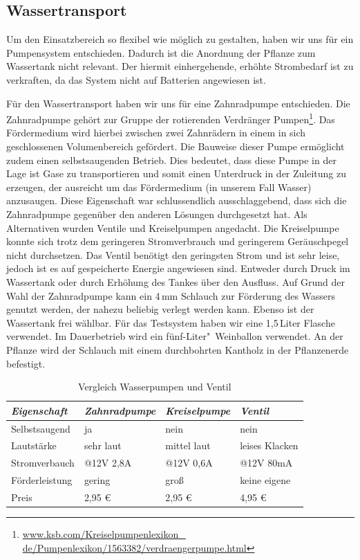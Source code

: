 \subsection{Wassertransport}
Um den Einsatzbereich so flexibel wie möglich zu gestalten, haben wir uns für ein Pumpensystem entschieden. 
Dadurch ist die Anordnung der Pflanze zum Wassertank nicht relevant. 
Der hiermit einhergehende, erhöhte Strombedarf ist zu verkraften, da das System nicht auf Batterien angewiesen ist.

Für den Wassertransport haben wir uns für eine Zahnradpumpe entschieden.
Die Zahnradpumpe gehört zur Gruppe der rotierenden Verdränger Pumpen\footnote{\href{http://www.ksb.com/Kreiselpumpenlexikon\_de/Pumpenlexikon/1563382/verdraengerpumpe.html}{www.ksb.com/Kreiselpumpenlexikon\_ \\ de/Pumpenlexikon/1563382/verdraengerpumpe.html}}.
Das Fördermedium wird hierbei zwischen zwei Zahnrädern in einem in sich geschlossenen Volumenbereich gefördert.
Die Bauweise dieser Pumpe ermöglicht zudem einen selbstsaugenden Betrieb. 
Dies bedeutet, dass diese Pumpe in der Lage ist Gase zu transportieren und somit einen Unterdruck in der Zuleitung zu erzeugen, der ausreicht um das Fördermedium (in unserem Fall Wasser) anzusaugen. 
Diese Eigenschaft war schlussendlich ausschlaggebend, dass sich die Zahnradpumpe gegenüber den anderen Lösungen durchgesetzt hat.
Als Alternativen wurden Ventile und Kreiselpumpen angedacht.
Die Kreiselpumpe konnte sich trotz dem geringeren Stromverbrauch und geringerem Geräuschpegel nicht durchsetzen. 
Das Ventil benötigt den geringsten Strom und ist sehr leise, jedoch ist es auf gespeicherte Energie angewiesen sind.  
Entweder durch Druck im Wassertank oder durch Erhöhung des Tankes über den Ausfluss. 
Auf Grund der Wahl der Zahnradpumpe kann ein 4\,mm Schlauch zur Förderung des Wassers genutzt werden, der nahezu beliebig verlegt werden kann.  
Ebenso ist der Wassertank frei wählbar. Für das Testsystem haben wir eine 1,5\,Liter Flasche verwendet. Im Dauerbetrieb wird ein fünf-Liter"~Weinballon verwendet. 
An der Pflanze wird der Schlauch mit einem durchbohrten Kantholz in der Pflanzenerde befestigt.

	
\begin{table}
	\centering
		\onehalfspacing
	\footnotesize
	\caption{Vergleich Wasserpumpen und Ventil}
	\label{Vergleich zwischen Wasserpumpen und Ventil}
		\begin{tabular}{|l|lll|}
		\hline
		\textit{Eigenschaft} & \textit{Zahnradpumpe} & \textit{Kreiselpumpe} & \textit{Ventil} \\
		\hline
		Selbstsaugend	&ja	&nein &nein\\		
		Lautstärke		&sehr laut	&mittel laut	&leises Klacken\\
		Stromverbauch	&@12V 2,8A	&@12V 0,6A	&@12V 80mA\\
		Förderleistung	&gering		&groß		&keine eigene\\
		Preis			&2,95 \euro	& 2,95 \euro	&	4,95 \euro\\
		\hline		
		\end{tabular}
		
\end{table}	
	
